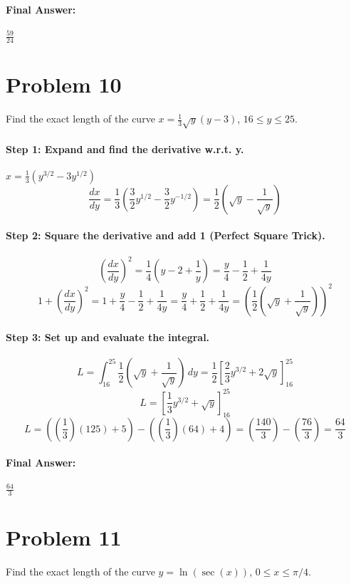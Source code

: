 \documentclass{article}
\begin{document}
\paragraph{Final Answer:} $\frac{59}{24}$

\section*{Problem 10}
Find the exact length of the curve $x = \frac{1}{3}\sqrt{y} (y - 3)$, $16 \le y \le 25$.

\paragraph{Step 1: Expand and find the derivative w.r.t. y.}
$x = \frac{1}{3}(y^{3/2} - 3y^{1/2})$
\[ \frac{dx}{dy} = \frac{1}{3}( \frac{3}{2}y^{1/2} - \frac{3}{2}y^{-1/2} ) = \frac{1}{2}(\sqrt{y} - \frac{1}{\sqrt{y}}) \]

\paragraph{Step 2: Square the derivative and add 1 (Perfect Square Trick).}
\[ (\frac{dx}{dy})^2 = \frac{1}{4}(y - 2 + \frac{1}{y}) = \frac{y}{4} - \frac{1}{2} + \frac{1}{4y} \]
\[ 1 + (\frac{dx}{dy})^2 = 1 + \frac{y}{4} - \frac{1}{2} + \frac{1}{4y} = \frac{y}{4} + \frac{1}{2} + \frac{1}{4y} = (\frac{1}{2}(\sqrt{y} + \frac{1}{\sqrt{y}}))^2 \]

\paragraph{Step 3: Set up and evaluate the integral.}
\[ L = \int_{16}^{25} \frac{1}{2}(\sqrt{y} + \frac{1}{\sqrt{y}}) \,dy = \frac{1}{2} [\frac{2}{3}y^{3/2} + 2\sqrt{y}]_{16}^{25} \]
\[ L = [\frac{1}{3}y^{3/2} + \sqrt{y}]_{16}^{25} \]
\[ L = ( (\frac{1}{3})(125) + 5 ) - ( (\frac{1}{3})(64) + 4 ) = (\frac{140}{3}) - (\frac{76}{3}) = \frac{64}{3} \]

\paragraph{Final Answer:} $\frac{64}{3}$

\section*{Problem 11}
Find the exact length of the curve $y = \ln(\sec(x))$, $0 \le x \le \pi/4$.
\end{document}
